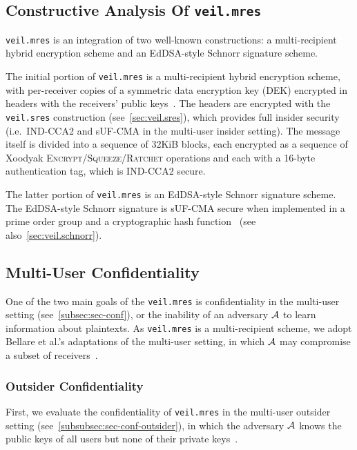 \subsection{Constructive Analysis Of \texttt{veil.mres}}\label{subsec:veil.mres-analysis}

\texttt{veil.mres} is an integration of two well-known constructions: a multi-recipient hybrid encryption scheme and an
EdDSA-style Schnorr signature scheme.

The initial portion of \texttt{veil.mres} is a multi-recipient hybrid encryption scheme, with per-receiver copies of a
symmetric data encryption key (DEK) encrypted in headers with the receivers' public
keys~\cite{kurosawa2002, bellare2003, bellare2007, rfc4880}.
The headers are encrypted with the \texttt{veil.sres} construction (see~\ref{sec:veil.sres}), which provides full
insider security (i.e.\ IND-CCA2 and sUF-CMA in the multi-user insider setting).
The message itself is divided into a sequence of 32KiB blocks, each encrypted as a sequence of Xoodyak
\textsc{Encrypt}/\textsc{Squeeze}/\textsc{Ratchet} operations and each with a 16-byte authentication tag, which is
IND-CCA2 secure.

The latter portion of \texttt{veil.mres} is an EdDSA-style Schnorr signature scheme.
The EdDSA-style Schnorr signature is sUF-CMA secure when implemented in a prime order group and a cryptographic hash
function~\cite{brendel2021, chalkias2020, pointcheval2000, neven2009} (see also~\ref{sec:veil.schnorr}).

\subsection{Multi-User Confidentiality}\label{subsec:veil.mres-conf}

One of the two main goals of the \texttt{veil.mres} is confidentiality in the multi-user setting
(see~\ref{subsec:sec-conf}), or the inability of an adversary $\mathcal{A}$ to learn information about plaintexts.
As \texttt{veil.mres} is a multi-recipient scheme, we adopt Bellare et al.'s adaptations of the multi-user
setting, in which $\mathcal{A}$ may compromise a subset of receivers~\cite{bellare2007}.

\subsubsection{Outsider Confidentiality}

First, we evaluate the confidentiality of \texttt{veil.mres} in the multi-user outsider setting
(see~\ref{subsubsec:sec-conf-outsider}), in which the adversary $\mathcal{A}$ knows the public keys of all users but none
of their private keys~\cite[p. 44]{baek2010}.

